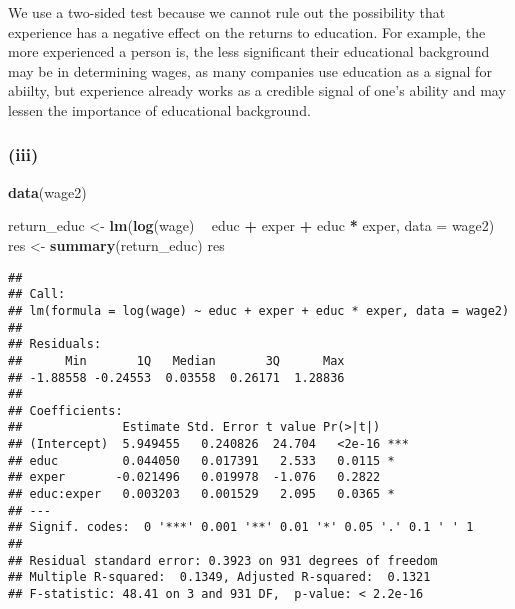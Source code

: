\documentclass[
]{article}
\newenvironment{Shaded}{\begin{snugshade}}{\end{snugshade}}
\newcommand{\DataTypeTok}[1]{\textcolor[rgb]{0.13,0.29,0.53}{#1}}
\newcommand{\KeywordTok}[1]{\textcolor[rgb]{0.13,0.29,0.53}{\textbf{#1}}}
\newcommand{\NormalTok}[1]{#1}
\newcommand{\OperatorTok}[1]{\textcolor[rgb]{0.81,0.36,0.00}{\textbf{#1}}}
\newcommand{\StringTok}[1]{\textcolor[rgb]{0.31,0.60,0.02}{#1}}
\begin{document}
We use a two-sided test because we cannot rule out the possibility that
experience has a negative effect on the returns to education. For
example, the more experienced a person is, the less significant their
educational background may be in determining wages, as many companies
use education as a signal for abiilty, but experience already works as a
credible signal of one's ability and may lessen the importance of
educational background.

\hypertarget{iii-4}{%
\subsubsection{(iii)}\label{iii-4}}

\begin{Shaded}
\begin{Highlighting}[]
\KeywordTok{data}\NormalTok{(wage2)}
\end{Highlighting}
\end{Shaded}

\begin{Shaded}
\begin{Highlighting}[]
\NormalTok{return_educ <-}\StringTok{ }\KeywordTok{lm}\NormalTok{(}\KeywordTok{log}\NormalTok{(wage) }\OperatorTok{~}\StringTok{ }\NormalTok{educ }\OperatorTok{+}\StringTok{ }\NormalTok{exper }\OperatorTok{+}\StringTok{ }\NormalTok{educ }\OperatorTok{*}\StringTok{ }\NormalTok{exper, }\DataTypeTok{data =}\NormalTok{ wage2)}
\NormalTok{res <-}\StringTok{ }\KeywordTok{summary}\NormalTok{(return_educ)}
\NormalTok{res}
\end{Highlighting}
\end{Shaded}

\begin{verbatim}
## 
## Call:
## lm(formula = log(wage) ~ educ + exper + educ * exper, data = wage2)
## 
## Residuals:
##      Min       1Q   Median       3Q      Max 
## -1.88558 -0.24553  0.03558  0.26171  1.28836 
## 
## Coefficients:
##              Estimate Std. Error t value Pr(>|t|)    
## (Intercept)  5.949455   0.240826  24.704   <2e-16 ***
## educ         0.044050   0.017391   2.533   0.0115 *  
## exper       -0.021496   0.019978  -1.076   0.2822    
## educ:exper   0.003203   0.001529   2.095   0.0365 *  
## ---
## Signif. codes:  0 '***' 0.001 '**' 0.01 '*' 0.05 '.' 0.1 ' ' 1
## 
## Residual standard error: 0.3923 on 931 degrees of freedom
## Multiple R-squared:  0.1349, Adjusted R-squared:  0.1321 
## F-statistic: 48.41 on 3 and 931 DF,  p-value: < 2.2e-16
\end{verbatim}
\end{document}
